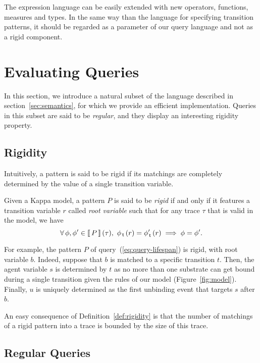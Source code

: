 \documentclass[runningheads]{llncs}
\begin{document}
The expression language can be easily extended with new operators,
functions, measures and types. In the same way than the language for
specifying transition patterns, it should be regarded as a parameter
of our query language and not as a rigid component.


 

\section{Evaluating Queries}\label{sec:evaluating-queries}

In this section, we introduce a natural subset of the language
described in section~\ref{sec:semantics}, for which we provide an
efficient implementation. Queries in this subset are said to be
\emph{regular}, and they display an interesting {rigidity} property.

\subsection{Rigidity}

Intuitively, a pattern is said to be rigid if its matchings are
completely determined by the value of a single transition variable.
\begin{definition}\label{def:rigidity}
  Given a Kappa model, a pattern $P$ is said to be \emph{rigid} if and
  only if it features a transition variable $r$ called \emph{root
    variable} such that for any trace $\tau$ that is valid in the
  model, we have
  \[ \forall\, \phi, \phi' \in \Sem{P}(\tau), \ \phi_{\Tr}\,(r) =
    \phi'_{\Tr}\,(r) \implies \phi = \phi'. \]
\end{definition}
For example, the pattern $P$ of query~(\ref{eq:query-lifespan})
is rigid, with root variable $b$. Indeed, suppose that $b$ is matched
to a specific transition $t$. Then, the agent variable $s$ is
determined by $t$ as no more than one substrate can get bound during a
single transition given the rules of our model
(Figure~\ref{fig:model}). Finally, $u$ is uniquely determined as the
first unbinding event that targets $s$ after $b$.

An easy consequence of Definition~\ref{def:rigidity} is that the
number of matchings of a rigid pattern into a trace is bounded by the
size of this trace.

\subsection{Regular Queries}
\end{document}
